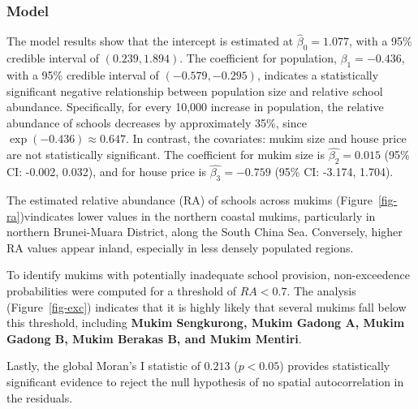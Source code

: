 \documentclass[
  12pt,
]{article}
\begin{document}
\subsubsection{Model}\label{sec-results-model}

The model results show that the intercept is estimated at
\(\hat{\beta}_0 = 1.077\), with a 95\% credible interval of
\((0.239, 1.894)\). The coefficient for population,
\(\beta_1 = -0.436\), with a 95\% credible interval of
\((-0.579, -0.295)\), indicates a statistically significant negative
relationship between population size and relative school abundance.
Specifically, for every 10,000 increase in population, the relative
abundance of schools decreases by approximately 35\%, since
\(\exp(-0.436) \approx 0.647\). In contrast, the covariates: mukim size
and house price are not statistically significant. The coefficient for
mukim size is \(\hat{\beta_2}=0.015\) (95\% CI: -0.002, 0.032), and for
house price is \(\hat{\beta_3}=-0.759\) (95\% CI: -3.174, 1.704).

The estimated relative abundance (RA) of schools across mukims
(Figure~\ref{fig-ra})vindicates lower values in the northern coastal
mukims, particularly in northern Brunei-Muara District, along the South
China Sea. Conversely, higher RA values appear inland, especially in
less densely populated regions.

To identify mukims with potentially inadequate school provision,
non-exceedence probabilities were computed for a threshold of
\(RA <0.7\). The analysis (Figure~\ref{fig-exc}) indicates that it is
highly likely that several mukims fall below this threshold, including
\textbf{Mukim Sengkurong, Mukim Gadong A, Mukim Gadong B, Mukim Berakas
B, and Mukim Mentiri}.

Lastly, the global Moran's I statistic of \(0.213\) (\(p<0.05\))
provides statistically significant evidence to reject the null
hypothesis of no spatial autocorrelation in the residuals.
\end{document}
